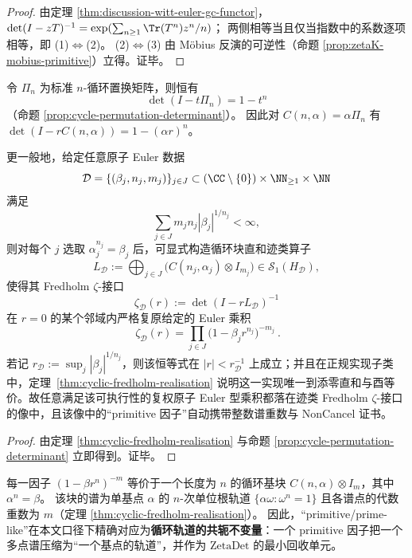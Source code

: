 \begin{proof}
由定理 \ref{thm:discussion-witt-euler-gc-functor}，
\(
\det(I-zT)^{-1}
=\exp(\sum_{n\ge 1}\Tr(T^n)z^n/n)
\)；
两侧相等当且仅当指数中的系数逐项相等，即 (1)\(\Longleftrightarrow\)(2)。
(2)\(\Longleftrightarrow\)(3) 由 Möbius 反演的可逆性（命题 \ref{prop:zetaK-mobius-primitive}）立得。证毕。
\end{proof}

\begin{theorem}\label{thm:discussion-traceclass-fredholm-euler-surjection}
令 \(\Pi_n\) 为标准 \(n\)-循环置换矩阵，则恒有
\[
\det(I-t\Pi_n)=1-t^n
\]
（命题 \ref{prop:cycle-permutation-determinant}）。
因此对 \(C(n,\alpha)=\alpha\Pi_n\) 有
\(\det(I-rC(n,\alpha))=1-(\alpha r)^n\)。
\par
更一般地，给定任意原子 Euler 数据
\[
\mathcal D=\{(\beta_j,n_j,m_j)\}_{j\in J}
\subset (\CC\setminus\{0\})\times \NN_{\ge 1}\times \NN
\]
满足
\[
\sum_{j\in J}m_jn_j|\beta_j|^{1/n_j}<\infty,
\]
则对每个 \(j\) 选取 \(\alpha_j^{n_j}=\beta_j\) 后，可显式构造循环块直和迹类算子
\[
L_{\mathcal D}:=\bigoplus_{j\in J}\bigl(C(n_j,\alpha_j)\otimes I_{m_j}\bigr)\in\mathcal{S}_1(H_{\mathcal D}),
\]
使得其 Fredholm \(\zeta\)-接口
\[
\zeta_{\mathcal D}(r):=\det(I-rL_{\mathcal D})^{-1}
\]
在 \(r=0\) 的某个邻域内严格复原给定的 Euler 乘积
\[
\boxed{\ \zeta_{\mathcal D}(r)=\prod_{j\in J}\bigl(1-\beta_j r^{n_j}\bigr)^{-m_j}\ }.
\]
若记 \(r_{\mathcal D}:=\sup_j|\beta_j|^{1/n_j}\)，则该恒等式在 \(|r|<r_{\mathcal D}^{-1}\) 上成立；并且在正规实现子类中，定理~\ref{thm:cyclic-fredholm-realisation} 说明这一实现唯一到添零直和与酉等价。故任意满足该可执行性的复权原子 Euler 型乘积都落在迹类 Fredholm \(\zeta\)-接口的像中，且该像中的“primitive 因子”自动携带整数谱重数与 NonCancel 证书。
\end{theorem}

\begin{proof}
由定理 \ref{thm:cyclic-fredholm-realisation} 与命题 \ref{prop:cycle-permutation-determinant} 立即得到。证毕。
\end{proof}

\begin{corollary}[Euler 因子 \(=\) 单基点单位根轨道（primitive 原子）]\label{cor:discussion-euler-factor-is-basepoint-orbit}
每一因子 \((1-\beta r^{n})^{-m}\) 等价于一个长度为 \(n\) 的循环基块 \(C(n,\alpha)\otimes I_m\)，其中 \(\alpha^n=\beta\)。
该块的谱为单基点 \(\alpha\) 的 \(n\)-次单位根轨道
\(
\{\alpha\omega:\omega^n=1\}
\)
且各谱点的代数重数为 \(m\)（定理 \ref{thm:cyclic-fredholm-realisation}）。
因此，“primitive/prime-like”在本文口径下精确对应为\textbf{循环轨道的共轭不变量}：一个 primitive 因子把一个多点谱压缩为“一个基点的轨道”，并作为 \(\mathrm{ZetaDet}\) 的最小回收单元。
\end{corollary}

